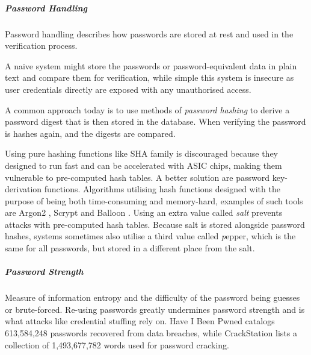 \subparagraph{Password Handling}
Password handling describes how passwords are stored at rest and used in the verification process.

A naive system might store the passwords or password-equivalent data in plain text and compare them for verification, while simple this system is insecure as user credentials directly are exposed with any unauthorised access.

A common approach today is to use methods of \textit{password hashing} to derive a password digest that is then stored in the database. 
When verifying the password is hashes again, and the digests are compared.

Using pure hashing functions like SHA family is discouraged because they designed to run fast and can be accelerated with ASIC chips, making them vulnerable to pre-computed hash tables.
A better solution are password key-derivation functions. 
Algorithms utilising hash functions designed with the purpose of being both time-consuming and memory-hard, examples of such tools are Argon2 \cite{biryukov2016argon2}, Scrypt \cite{percival2016scrypt} and Balloon \cite{boneh2016balloon}.
Using an extra value called \textit{salt} \cite{hornby2016salted} prevents attacks with pre-computed hash tables.
Because salt is stored alongside password hashes, systems sometimes also utilise a third value called \textit pepper, which is the same for all passwords, but stored in a different place from the salt.


\subparagraph{Password Strength}
Measure of information entropy and the difficulty of the password being guesses or brute-forced.
Re-using passwords greatly undermines password strength and is what attacks like credential stuffing rely on.
Have I Been Pwned \cite{hunt2021have} catalogs 613,584,248 passwords recovered from data breaches, while CrackStation \cite{hornby2019password} lists a collection of 1,493,677,782 words used for password cracking.
